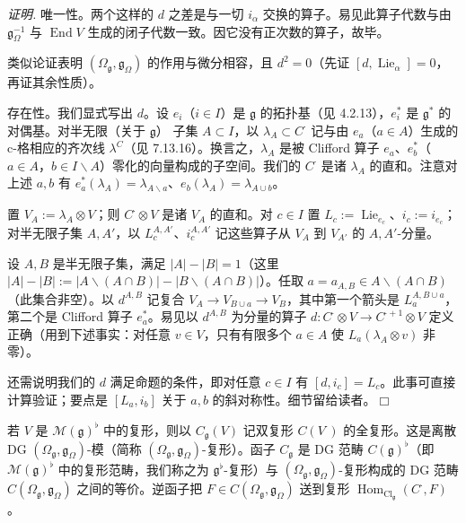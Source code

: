\emph{证明.} 唯一性。两个这样的 $d$ 之差是与一切 $i_{\alpha}$ 交换的算子。易见此算子代数与由 $\mathfrak{g}^{-1}_{\Omega}$ 与 $\operatorname{End}V$ 生成的闭子代数一致。因它没有正次数的算子，故毕。

类似论证表明 $(\Omega_{\mathfrak{g}},\mathfrak{g}_{\Omega})$ 的作用与微分相容，且 $d^{2}=0$（先证 $[d,\operatorname{Lie}_{\alpha}]=0$，再证其余性质）。

存在性。我们显式写出 $d$。设 $e_{i}$（$i\in I$）是 $\mathfrak{g}$ 的拓扑基（见 4.2.13），$e^{*}_{i}$ 是 $\mathfrak{g}^{*}$ 的对偶基。对半无限（关于 $\mathfrak{g}$）%
子集 $A\subset I$，以 $\lambda_{A}\subset C^{\cdot}$ 记与由 $e_{a}$（$a\in A$）生成的 c-格相应的齐次线 $\lambda^{C}$（见 7.13.16）。换言之，$\lambda_{A}$ 是被 Clifford 算子 $e_{a}$、$e^{*}_{b}$（$a\in A$，$b\in I\backslash A$）零化的向量构成的子空间。我们的 $C^{\cdot}$ 是诸 $\lambda_{A}$ 的直和。注意对上述 $a,b$ 有 $e^{*}_{a}(\lambda_{A})=\lambda_{A\backslash a}$、$e_{b}(\lambda_{A})=\lambda_{A\cup b}$。

置 $V_{A}:=\lambda_{A}\otimes V$；则 $C^{\cdot}\otimes V$ 是诸 $V_{A}$ 的直和。对 $c\in I$ 置 $L_{c}:=\operatorname{Lie}_{e_{c}}$、$i_{c}:=i_{e_{c}}$；对半无限子集 $A,A'$，以 $L^{A,A'}_{c}$、$i^{A,A'}_{c}$ 记这些算子从 $V_{A}$ 到 $V_{A'}$ 的 $A,A'$-分量。

设 $A,B$ 是半无限子集，满足 $|A|-|B|=1$（这里 $|A|-|B|:=|A\backslash(A\cap B)|-|B\backslash(A\cap B)|$）。任取 $a=a_{A,B}\in A\backslash(A\cap B)$（此集合非空）。以 $d^{A,B}$ 记复合 $V_{A}\to V_{B\cup a}\to V_{B}$，其中第一个箭头是 $L^{A,B\cup a}_{a}$，第二个是 Clifford 算子 $e^{*}_{a}$。易见以 $d^{A,B}$ 为分量的算子 $d:C^{\cdot}\otimes V\to C^{\cdot+1}\otimes V$ 定义正确（用到下述事实：对任意 $v\in V$，只有有限多个 $a\in A$ 使 $L_{a}(\lambda_{A}\otimes v)$ 非零）。

还需说明我们的 $d$ 满足命题的条件，即对任意 $c\in I$ 有 $[d,i_{c}]=L_{c}$。此事可直接计算验证；要点是 $[L_{a},i_{b}]$ 关于 $a,b$ 的斜对称性。细节留给读者。\hfill$\Box$

 若 $V$ 是 $\mathcal{M}(\mathfrak{g})^{\flat}$ 中的复形，则以 $C_{\mathfrak{g}}(V)$ 记双复形 $C(V^{\cdot})$ 的全复形。这是离散 DG $(\Omega_{\mathfrak{g}},\mathfrak{g}_{\Omega})$-模（简称 $(\Omega_{\mathfrak{g}},\mathfrak{g}_{\Omega})$-复形）。函子 $C_{\mathfrak{g}}$ 是 DG 范畴 $C(\mathfrak{g})^{\flat}$（即 $\mathcal{M}(\mathfrak{g})^{\flat}$ 中的复形范畴，我们称之为 $\mathfrak{g}^{\flat}$-复形）与 $(\Omega_{\mathfrak{g}},\mathfrak{g}_{\Omega})$-复形构成的 DG 范畴 $C(\Omega_{\mathfrak{g}},\mathfrak{g}_{\Omega})$ 之间的等价。逆函子把 $F\in C(\Omega_{\mathfrak{g}},\mathfrak{g}_{\Omega})$ 送到复形 $\operatorname{Hom}_{\mathrm{Cl}_{\mathfrak{g}}}(C^{\cdot},F)$。

